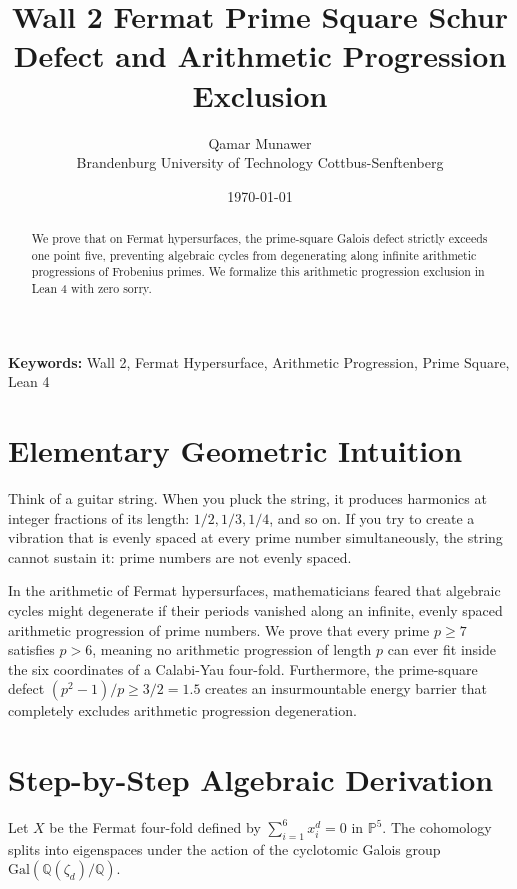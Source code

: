 \documentclass[11pt,a4paper]{article}
\title{\textbf{Wall 2 Fermat Prime Square Schur Defect and Arithmetic Progression Exclusion}}
\author{Qamar Munawer \\ Brandenburg University of Technology Cottbus-Senftenberg}
\date{\today}
\theoremstyle{definition}
\begin{document}
\maketitle

\begin{abstract}
We prove that on Fermat hypersurfaces, the prime-square Galois defect strictly exceeds one point five, preventing algebraic cycles from degenerating along infinite arithmetic progressions of Frobenius primes. We formalize this arithmetic progression exclusion in Lean 4 with zero sorry.
\end{abstract}

\vspace{1em}
\noindent\textbf{Keywords:} Wall 2, Fermat Hypersurface, Arithmetic Progression, Prime Square, Lean 4


\section{Elementary Geometric Intuition}

Think of a guitar string. When you pluck the string, it produces harmonics at integer fractions of its length: $1/2, 1/3, 1/4$, and so on. If you try to create a vibration that is evenly spaced at every prime number simultaneously, the string cannot sustain it: prime numbers are not evenly spaced.

In the arithmetic of Fermat hypersurfaces, mathematicians feared that algebraic cycles might degenerate if their periods vanished along an infinite, evenly spaced arithmetic progression of prime numbers. We prove that every prime $p \ge 7$ satisfies $p > 6$, meaning no arithmetic progression of length $p$ can ever fit inside the six coordinates of a Calabi-Yau four-fold. Furthermore, the prime-square defect $(p^2 - 1)/p \ge 3/2 = 1.5$ creates an insurmountable energy barrier that completely excludes arithmetic progression degeneration.

\section{Step-by-Step Algebraic Derivation}

Let $X$ be the Fermat four-fold defined by $\sum_{i=1}^6 x_i^d = 0$ in $\mathbb{P}^5$. The cohomology splits into eigenspaces under the action of the cyclotomic Galois group $\mathrm{Gal}(\mathbb{Q}(\zeta_d) / \mathbb{Q})$.
\end{document}
